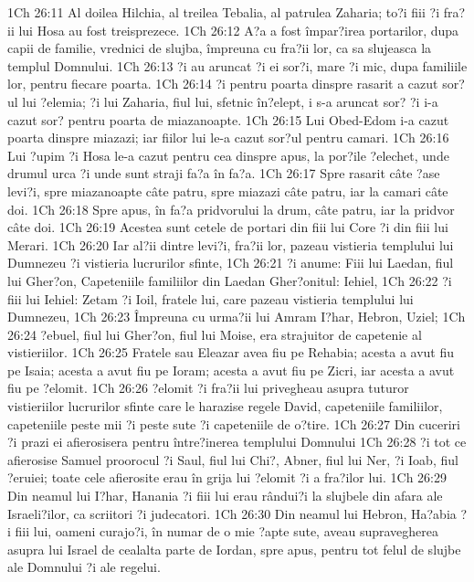 1Ch 26:11  Al doilea Hilchia, al treilea Tebalia, al patrulea Zaharia; to?i fiii ?i fra?ii lui Hosa au fost treisprezece.
1Ch 26:12  A?a a fost împar?irea portarilor, dupa capii de familie, vrednici de slujba, împreuna cu fra?ii lor, ca sa slujeasca la templul Domnului.
1Ch 26:13  ?i au aruncat ?i ei sor?i, mare ?i mic, dupa familiile lor, pentru fiecare poarta.
1Ch 26:14  ?i pentru poarta dinspre rasarit a cazut sor?ul lui ?elemia; ?i lui Zaharia, fiul lui, sfetnic în?elept, i s-a aruncat sor? ?i i-a cazut sor? pentru poarta de miazanoapte.
1Ch 26:15  Lui Obed-Edom i-a cazut poarta dinspre miazazi; iar fiilor lui le-a cazut sor?ul pentru camari.
1Ch 26:16  Lui ?upim ?i Hosa le-a cazut pentru cea dinspre apus, la por?ile ?elechet, unde drumul urca ?i unde sunt straji fa?a în fa?a.
1Ch 26:17  Spre rasarit câte ?ase levi?i, spre miazanoapte câte patru, spre miazazi câte patru, iar la camari câte doi.
1Ch 26:18  Spre apus, în fa?a pridvorului la drum, câte patru, iar la pridvor câte doi.
1Ch 26:19  Acestea sunt cetele de portari din fiii lui Core ?i din fiii lui Merari.
1Ch 26:20  Iar al?ii dintre levi?i, fra?ii lor, pazeau vistieria templului lui Dumnezeu ?i vistieria lucrurilor sfinte,
1Ch 26:21  ?i anume: Fiii lui Laedan, fiul lui Gher?on, Capeteniile familiilor din Laedan Gher?onitul: Iehiel,
1Ch 26:22  ?i fiii lui Iehiel: Zetam ?i Ioil, fratele lui, care pazeau vistieria templului lui Dumnezeu,
1Ch 26:23  Împreuna cu urma?ii lui Amram I?har, Hebron, Uziel;
1Ch 26:24  ?ebuel, fiul lui Gher?on, fiul lui Moise, era strajuitor de capetenie al vistieriilor.
1Ch 26:25  Fratele sau Eleazar avea fiu pe Rehabia; acesta a avut fiu pe Isaia; acesta a avut fiu pe Ioram; acesta a avut fiu pe Zicri, iar acesta a avut fiu pe ?elomit.
1Ch 26:26  ?elomit ?i fra?ii lui privegheau asupra tuturor vistieriilor lucrurilor sfinte care le harazise regele David, capeteniile familiilor,  capeteniile peste mii ?i peste sute ?i capeteniile de o?tire.
1Ch 26:27  Din cuceriri ?i prazi ei afierosisera pentru între?inerea templului Domnului
1Ch 26:28  ?i tot ce afierosise Samuel proorocul ?i Saul, fiul lui Chi?, Abner, fiul lui Ner, ?i Ioab, fiul ?eruiei; toate cele afierosite erau în grija lui ?elomit ?i a fra?ilor lui.
1Ch 26:29  Din neamul lui I?har, Hanania ?i fiii lui erau rândui?i la slujbele din afara ale Israeli?ilor, ca scriitori ?i judecatori.
1Ch 26:30  Din neamul lui Hebron, Ha?abia ?i fiii lui, oameni curajo?i, în numar de o mie ?apte sute, aveau supravegherea asupra lui Israel de cealalta parte de Iordan, spre apus, pentru tot felul de slujbe ale Domnului ?i ale regelui.
